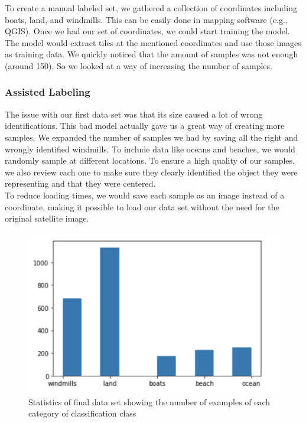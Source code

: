 To create a manual labeled set, we gathered a collection of coordinates including boats, land, and windmills. This can be easily done in mapping software (e.g., QGIS). Once we had our set of coordinates, we could start training the model. The model would extract tiles at the mentioned coordinates and use those images as training data. We quickly noticed that the amount of samples was not enough (around 150). So we looked at a way of increasing the number of samples.

\subsubsection{Assisted Labeling}

The issue with our first data set was that its size caused a lot of wrong identifications. This bad model actually gave us a great way of creating more samples. We expanded the number of samples we had by saving all the right and wrongly identified windmills. To include data like oceans and beaches, we would randomly sample at different locations. To ensure a high quality of our samples, we also review each one to make sure they clearly identified the object they were representing and that they were centered. \\

To reduce loading times, we would save each sample as an image instead of a coordinate, making it possible to load our data set without the need for the original satellite image. \\

\begin{figure}[ht]
\begin{center}
\centerline{\includegraphics[width=\columnwidth]{images/dataset-stats.png}}
\caption{Statistics of final data set showing the number of examples of each category of classification class}
\label{dataset-statistics}
\end{center}
\end{figure}

